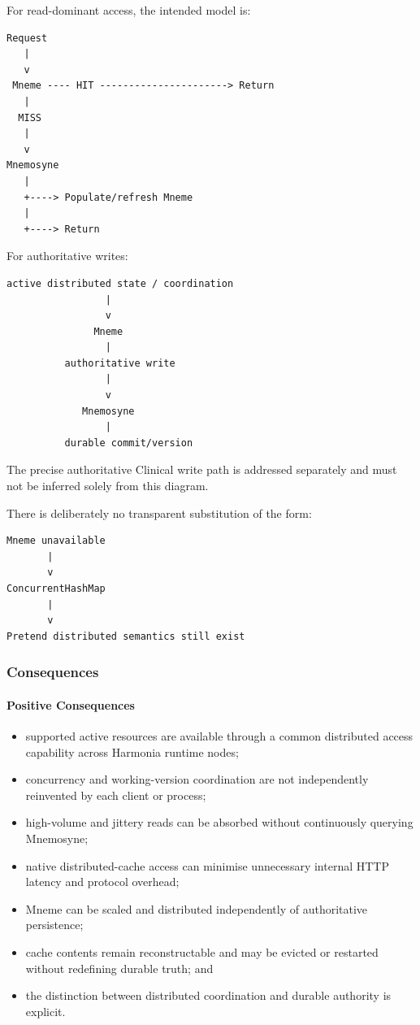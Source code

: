 For read-dominant access, the intended model is:

\begin{verbatim}
Request
   |
   v
 Mneme ---- HIT ----------------------> Return
   |
  MISS
   |
   v
Mnemosyne
   |
   +----> Populate/refresh Mneme
   |
   +----> Return
\end{verbatim}

For authoritative writes:

\begin{verbatim}
active distributed state / coordination
                 |
                 v
               Mneme
                 |
          authoritative write
                 |
                 v
             Mnemosyne
                 |
          durable commit/version
\end{verbatim}

The precise authoritative Clinical write path is addressed separately and must not be inferred solely from this diagram.

There is deliberately no transparent substitution of the form:

\begin{verbatim}
Mneme unavailable
       |
       v
ConcurrentHashMap
       |
       v
Pretend distributed semantics still exist
\end{verbatim}

\subsubsection{Consequences}

\paragraph{Positive Consequences}

\begin{itemize}
    \item supported active resources are available through a common distributed access capability across Harmonia runtime nodes;
    \item concurrency and working-version coordination are not independently reinvented by each client or process;
    \item high-volume and jittery reads can be absorbed without continuously querying Mnemosyne;
    \item native distributed-cache access can minimise unnecessary internal HTTP latency and protocol overhead;
    \item Mneme can be scaled and distributed independently of authoritative persistence;
    \item cache contents remain reconstructable and may be evicted or restarted without redefining durable truth; and
    \item the distinction between distributed coordination and durable authority is explicit.
\end{itemize}

